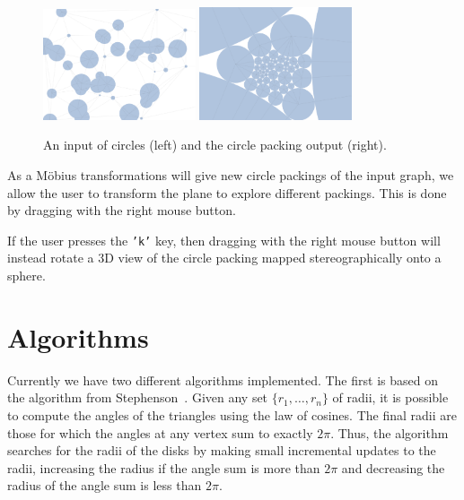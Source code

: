 \documentclass[a4paper,UKenglish]{lipics}
\begin{document}
  \begin{figure}[ht]
    \centering
      \includegraphics[width = 0.40\textwidth]{figures/input.png}
      \includegraphics[width = 0.40\textwidth]{figures/output.png}
    \caption{An input of circles (left) and the circle packing output (right).}
    \label{fig:input_output}
  \end{figure}
  
  As a M\"{o}bius transformations will give new circle packings of the input graph, we allow the user to transform the plane to explore different packings.
  This is done by dragging with the right mouse button.
  
  If the user presses the \texttt{'k'} key, then dragging with the right mouse button will instead rotate a 3D view of the circle packing mapped stereographically onto a sphere.
  

\section{Algorithms} %
\label{sec:algorithms}

  Currently we have two different algorithms implemented.
  The first is based on the algorithm from Stephenson~\cite{stephenson05introduction}.
  Given any set $\{r_1,\ldots, r_n\}$ of radii, it is possible to compute the angles of the triangles using the law of cosines.
  The final radii are those for which the angles at any vertex sum to exactly $2\pi$.
  Thus, the algorithm searches for the radii of the disks by making small incremental updates to the radii, increasing the radius if the angle sum is more than $2\pi$ and decreasing the radius of the angle sum is less than $2\pi$.
  
\end{document}
